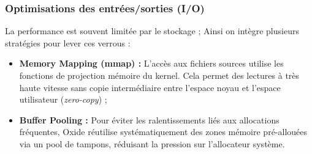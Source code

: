 \documentclass{article}
\begin{document}
\subsubsection*{Optimisations des entrées/sorties (I/O)}

La performance est souvent limitée par le stockage ; Ainsi on intègre plusieurs stratégies pour lever ces verrous :
\begin{itemize}
    \item \textbf{Memory Mapping (mmap) :} L'accès aux fichiers sources utilise les fonctions de projection mémoire du kernel. Cela permet des lectures à très haute vitesse sans copie intermédiaire entre l'espace noyau et l'espace utilisateur (\textit{zero-copy}) ;
    \item \textbf{Buffer Pooling :} Pour éviter les ralentissements liés aux allocations fréquentes, Oxide réutilise systématiquement des zones mémoire pré-allouées via un pool de tampons, réduisant la pression sur l'allocateur système.
\end{itemize}
\end{document}
